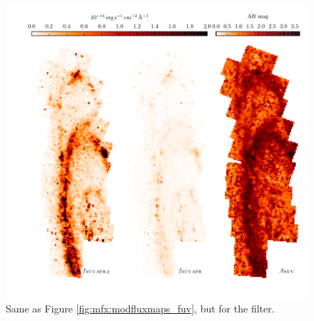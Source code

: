 \begin{figure}
\centering
\includegraphics[width=\textwidth]{m31flux-figures/modfluxmaps_nuv.pdf}
\caption[\nuv{} flux map modeled from the SFHs.]{Same as Figure
    \ref{fig:mfx:modfluxmaps_fuv}, but for the \nuv{} filter.
}
\label{fig:mfx:modfluxmaps_nuv}
\end{figure}


%
%





